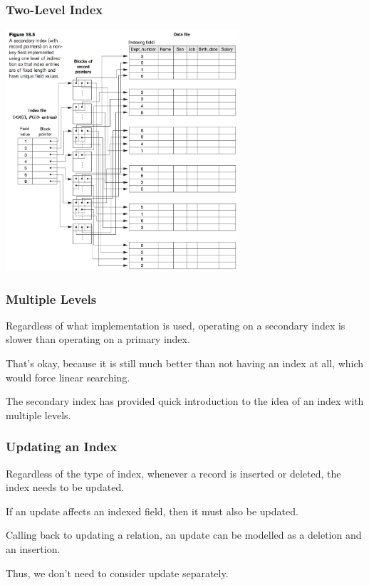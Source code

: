 \begin{frame}
\frametitle{Two-Level Index}

\begin{center}
\includegraphics[width=0.65\textwidth]{images/secondary-index-2level}
\end{center}


\end{frame}



\begin{frame}
\frametitle{Multiple Levels}

Regardless of what implementation is used, operating on a secondary index is slower than operating on a primary index. 

That's okay, because it is still much better than not having an index at all, which would force linear searching. 

The secondary index has provided quick introduction to the idea of an index with multiple levels.

\end{frame}


\begin{frame}
\frametitle{Updating an Index}

Regardless of the type of index, whenever a record is inserted or deleted, the index needs to be updated. 

If an update affects an indexed field, then it must also be updated. 

Calling back to updating a relation, an update can be modelled as a deletion and an insertion.

Thus, we don't need to consider update separately.

\end{frame}


